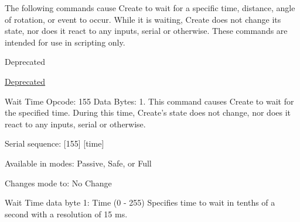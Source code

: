 \begin{Desc}
\begin{description}
The following commands cause Create to wait for a specific time, distance, angle of rotation, or event to occur. While it is waiting, Create does not change its state, nor does it react to any inputs, serial or otherwise. These commands are intended for use in scripting only.

\begin{DoxyRefDesc}{Deprecated}
\item[\hyperlink{deprecated__deprecated000006}{Deprecated}]\end{DoxyRefDesc}
\item[{\em 
\hypertarget{group__roomba-lib_gga305e17dfb7050ad83ea49ded2e6a2e24a3dbca2a6576b16fc30af00cbf8ff3b6d}{}W\+A\+I\+T\+\_\+\+T\+I\+M\+E\label{group__roomba-lib_gga305e17dfb7050ad83ea49ded2e6a2e24a3dbca2a6576b16fc30af00cbf8ff3b6d}
}]Wait Time Opcode\+: 155 Data Bytes\+: 1. This command causes Create to wait for the specified time. During this time, Create’s state does not change, nor does it react to any inputs, serial or otherwise.
\begin{DoxyItemize}
\item Serial sequence\+: \mbox{[}155\mbox{]} \mbox{[}time\mbox{]}
\item Available in modes\+: Passive, Safe, or Full
\item Changes mode to\+: No Change
\item Wait Time data byte 1\+: Time (0 -\/ 255) Specifies time to wait in tenths of a second with a resolution of 15 ms.
\end{DoxyItemize}


\end{description}
\end{Desc}
